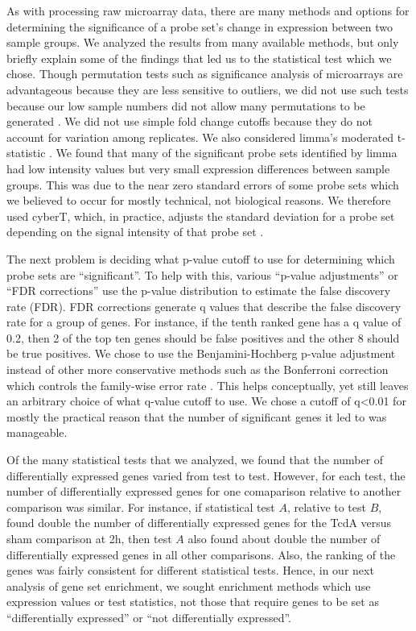 As with processing raw microarray data, there are many methods and options
for determining the significance of a probe set's change in expression between
two sample groups. We analyzed the results from many available methods, but only
briefly explain some of the findings that led us to the statistical test 
which we chose. Though permutation tests such as significance analysis of
microarrays are advantageous because they are less sensitive to outliers,
we did not use such tests because our low sample numbers did not allow
many permutations to be generated \cite{Tusher:2001kk}. We did not use 
simple fold change cutoffs because
they do not account for variation among replicates. We also considered limma's 
moderated t-statistic \cite{Smyth:2004gh}. We found
that many of the significant probe sets identified by limma had low intensity values but very
small expression differences between sample groups. This was due to the near zero standard 
errors of some probe sets which we believed to occur for mostly technical,
not biological reasons. We therefore used cyberT, which, in practice,
adjusts the standard deviation for a probe set depending on the signal intensity
of that probe set \cite{Baldi:2001ul}.

The next problem is deciding what p-value cutoff to use for determining which
probe sets are ``significant''. To help with this, various ``p-value adjustments'' or
``FDR corrections'' use the p-value distribution to estimate the false discovery
rate (FDR). FDR corrections generate q values that describe the false discovery
rate for a group of genes. For instance, if the tenth ranked gene has a q value of 0.2, then
2 of the top ten genes should be false positives and the other 8 should be true
positives. We chose to use the Benjamini-Hochberg p-value adjustment
instead of other more conservative methods such as the Bonferroni correction which
controls the family-wise error rate \cite{Benjamini:1995ws}. This 
helps conceptually, yet still leaves an arbitrary choice of 
what q-value cutoff to use. We chose a cutoff of q\textless{}0.01 for mostly the practical
reason that the number of significant genes it led to was manageable.

Of the many statistical tests that we analyzed, we found that the number of
differentially expressed genes varied from test to test. However, for each test,
the number of differentially expressed genes for one comaparison relative to
another comparison was similar. For instance,
if statistical test $A$, relative to test $B$, found double the number of differentially expressed genes
for the TcdA versus sham comparison at 2h, then test $A$ also found about double the number of
differentially expressed genes in all other comparisons. Also,
the ranking of the genes was fairly consistent for different statistical tests.
Hence, in our next analysis of gene set enrichment, we sought enrichment
methods which use expression values or test statistics, not those that require 
genes to be set as ``differentially expressed'' or ``not differentially expressed''.

